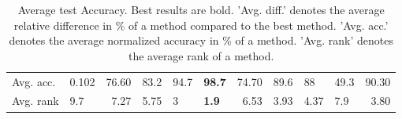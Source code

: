 \begin{table}[ht!]
\begin{tabular}{llrlllrlllr}
  Avg. acc. & 0.102 & 76.60 & 83.2 & 94.7 & \textbf{98.7} & 74.70 & 89.6 & 88 & 49.3 & 90.30 \\ 
  Avg. rank & 9.7 & 7.27 & 5.75 & 3 & \textbf{1.9} & 6.53 & 3.93 & 4.37 & 7.9 & 3.80 \\ 
   \hline
\hline
\end{tabular}
\endgroup
\caption{Average test Accuracy. 
                  Best results are bold. 
                  'Avg. diff.' denotes the average relative difference in \% of a method compared to the best method.
                  'Avg. acc.' denotes the average normalized accuracy in \% of a method.
                  'Avg. rank' denotes the average rank of a method.} 
\label{TABLES/table_results_Accuracy_spatial_depth}
\end{table}
